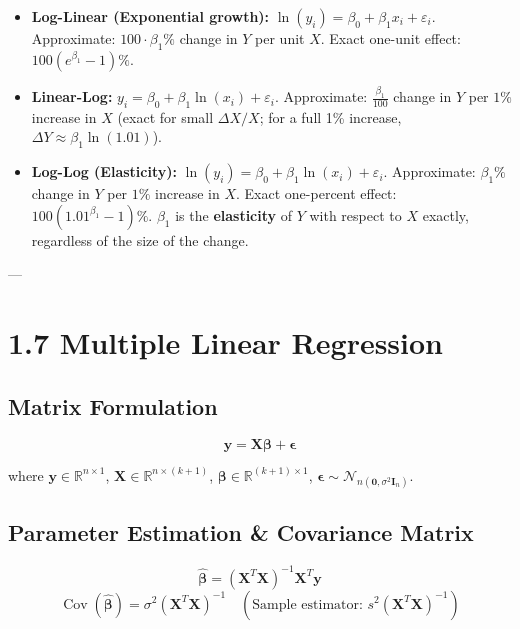 \documentclass[
]{article}
\begin{document}
\begin{itemize}
\item
  \textbf{Log-Linear (Exponential growth):}
  \(\ln(y_{i}) = \beta_{0} + \beta_{1}x_{i} + \varepsilon_{i}\).
  Approximate: \(100 \cdot \beta_{1}\%\) change in \(Y\) per unit \(X\).
  Exact one-unit effect: \(100\left( e^{\beta_{1}} - 1 \right)\%\).
\item
  \textbf{Linear-Log:}
  \(y_{i} = \beta_{0} + \beta_{1}\ln(x_{i}) + \varepsilon_{i}\).
  Approximate: \(\frac{\beta_{1}}{100}\) change in \(Y\) per \(1\%\)
  increase in \(X\) (exact for small \(\Delta X/X\); for a full 1\%
  increase, \(\Delta Y \approx \beta_{1}\ln(1.01)\)).
\item
  \textbf{Log-Log (Elasticity):}
  \(\ln(y_{i}) = \beta_{0} + \beta_{1}\ln(x_{i}) + \varepsilon_{i}\).
  Approximate: \(\beta_{1}\%\) change in \(Y\) per \(1\%\) increase in
  \(X\). Exact one-percent effect:
  \(100\left( 1.01^{\beta_{1}} - 1 \right)\%\). \(\beta_{1}\) is the
  \textbf{elasticity} of \(Y\) with respect to \(X\) exactly, regardless
  of the size of the change.
\end{itemize}

---

\textbf{ }

\section{1.7 Multiple Linear Regression}

\textbf{ }

\subsection{Matrix Formulation}

\[\mathbf{y} = \mathbf{X}\mathbf{\beta} + \mathbf{\epsilon}\]

where \(\mathbf{y} \in \mathbb{R}^{n \times 1}\),
\(\mathbf{X} \in \mathbb{R}^{n \times (k + 1)}\),
\(\mathbf{\beta} \in \mathbb{R}^{(k + 1) \times 1}\),
\(\mathbf{\epsilon} \sim \mathcal{N}_{n\left( \mathbf{0},\sigma^{2}\mathbf{I}_{n} \right)}\).

\textbf{ }

\subsection{Parameter Estimation \& Covariance Matrix}

\[\hat{\mathbf{\beta}} = \left( \mathbf{X}^{T}\mathbf{X} \right)^{- 1}\mathbf{X}^{T}\mathbf{y}\]
\[\operatorname{Cov}(\hat{\mathbf{\beta}}) = \sigma^{2}\left( \mathbf{X}^{T}\mathbf{X} \right)^{- 1}\quad\left( \text{Sample estimator:  }s^{2}\left( \mathbf{X}^{T}\mathbf{X} \right)^{- 1} \right)\]
\end{document}
